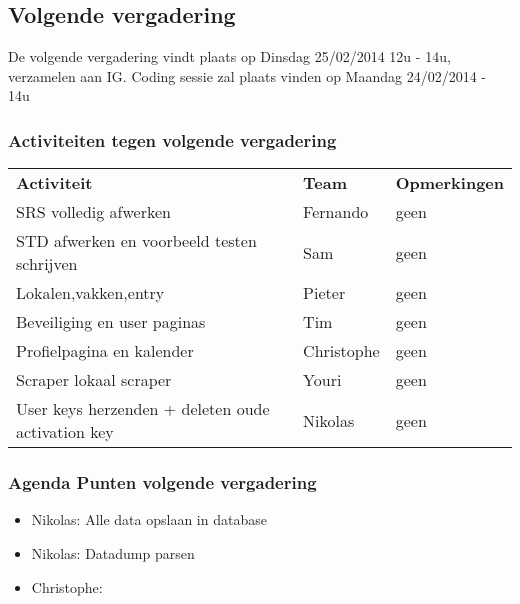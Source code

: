 \subsection{Volgende vergadering}
De volgende vergadering vindt plaats op Dinsdag 25/02/2014 12u - 14u, verzamelen aan IG.
Coding sessie zal plaats vinden op Maandag 24/02/2014 - 14u
\subsubsection{Activiteiten tegen volgende vergadering} \label{sec:TODOActiviteiten}
\begin{table} [H]
	\centering
	\begin{tabular} {l|l|l}
		\textbf{Activiteit} & \textbf{Team} & \textbf{Opmerkingen} \\
		SRS volledig afwerken & Fernando & geen \\
		STD afwerken en voorbeeld testen schrijven & Sam & geen \\
		Lokalen,vakken,entry & Pieter & geen \\
		Beveiliging en user paginas & Tim & geen \\
		Profielpagina en kalender & Christophe & geen \\
		Scraper lokaal scraper & Youri & geen \\
		User keys herzenden + deleten oude activation key & Nikolas & geen \\
		\hline
	\end{tabular}
\end{table}

\subsubsection{Agenda Punten volgende vergadering}

\begin{itemize}
	\item Nikolas: Alle data opslaan in database
	\item Nikolas: Datadump parsen
	\item Christophe: 
\end{itemize}
